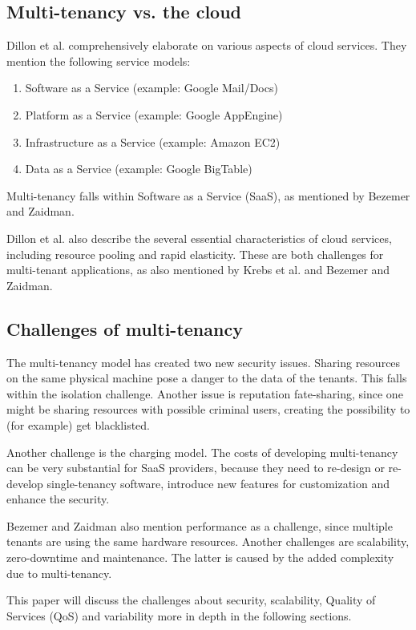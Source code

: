 
\subsection{Multi-tenancy vs. the cloud}

Dillon et al.\cite{dillon2010cloud} comprehensively elaborate on various aspects of cloud services. They mention the following service models: 

\begin{enumerate}
\item Software as a Service (example: Google Mail/Docs)
\item Platform as a Service (example: Google AppEngine)
\item Infrastructure as a Service (example: Amazon EC2)
\item Data as a Service (example: Google BigTable)
\end{enumerate}

Multi-tenancy falls within Software as a Service (SaaS), as mentioned by Bezemer and Zaidman.

Dillon et al. also describe the several essential characteristics of cloud services, including resource pooling and rapid elasticity. These are both challenges for multi-tenant applications, as also mentioned by Krebs et al.\cite{krebs2012architecture} and Bezemer and Zaidman\cite{bezemer2010multi}.

\subsection{Challenges of multi-tenancy}

The multi-tenancy model has created two new security issues\cite{dillon2010cloud}. Sharing resources on the same physical machine pose a danger to the data of the tenants. This falls within the isolation challenge. Another issue is reputation fate-sharing, since one might be sharing resources with possible criminal users, creating the possibility to (for example) get blacklisted.

Another challenge is the charging model. The costs of developing multi-tenancy can be very substantial for SaaS providers, because they need to re-design or re-develop single-tenancy software, introduce new features for customization and enhance the security.

Bezemer and Zaidman\cite{bezemer2010multi} also mention performance as a challenge, since multiple tenants are using the same hardware resources. Another challenges are scalability, zero-downtime and maintenance. The latter is caused by the added complexity due to multi-tenancy.

This paper will discuss the challenges about security, scalability, Quality of Services (QoS) and variability more in depth in the following sections.